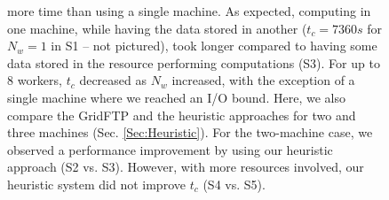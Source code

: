 \documentclass{rspublic}
\newcommand{\fixme}[1]{ { \bf{ ***FIXME: #1
}} } \newcommand{\jhanote}[1]{ {\textcolor{red} { ***Jha: #1 }}}
\newcommand{\micnote}[1]{ {\textcolor{blue} { ***Michael: #1 }}}
\newcommand{\betynote}[1]{ {\textcolor{orange} { ***Bety: #1 }}}
\newcommand{\jhanote}[1]{} \newcommand{\micnote}[1]{}\newcommand{\betynote}[1]{} \newcommand{\fixme}[1]{}
\begin{document}
\begin{figure}[!ht]
\begin{center}
{more time than using a single machine. As expected, computing in one
machine, while having the data stored in another ($t_c=7360s$ for $N_w=1$ in S1 -- not pictured), took longer
compared to having some data stored in the resource performing
computations (S3). For up to 8 workers, $t_c$ decreased as $N_w$
increased, with the exception of a single machine where we reached an
I/O bound. Here, we also compare the GridFTP and the heuristic
approaches for two and three machines (Sec. \ref{Sec:Heuristic}). For
the two-machine case, we observed a performance improvement by using our
heuristic approach (S2 vs. S3). However, with more resources involved,
our heuristic system did not improve $t_c$ (S4 vs. S5).}
\label{Fig:ExpIConventionalLocal}
\end{center}
\vspace{-0.3cm}
\end{figure}





\vspace{-0.3cm}

\end{document}
